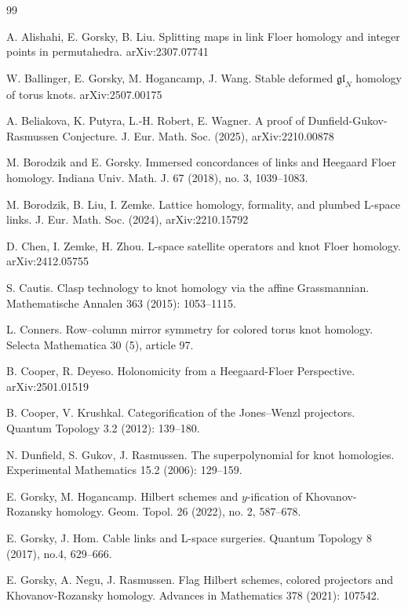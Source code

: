 \begin{thebibliography}{99}

 A. Alishahi, E. Gorsky, B. Liu. Splitting maps in link Floer homology and integer points in permutahedra. arXiv:2307.07741

 W. Ballinger, E. Gorsky, M. Hogancamp, J. Wang. Stable deformed $\mathfrak{gl}_N$ homology of torus knots. arXiv:2507.00175


  A. Beliakova, K. Putyra, L.-H. Robert, E. Wagner. A proof of Dunfield-Gukov-Rasmussen Conjecture. J. Eur. Math. Soc. (2025), arXiv:2210.00878

 M. Borodzik and E. Gorsky. Immersed concordances of links and Heegaard Floer homology. Indiana Univ. Math. J. 67 (2018), no. 3, 1039--1083. 



 M. Borodzik, B. Liu, I. Zemke. Lattice homology, formality,  and plumbed L-space links.  J. Eur. Math. Soc. (2024), arXiv:2210.15792

 D. Chen, I. Zemke, H. Zhou. L-space satellite operators and knot Floer homology. arXiv:2412.05755

 S. Cautis. Clasp technology to knot homology via the affine Grassmannian. Mathematische Annalen 363 (2015): 1053--1115.

 L. Conners. Row--column mirror symmetry for colored torus knot homology.
Selecta Mathematica 30 (5), article 97.

 B. Cooper, R. Deyeso.  Holonomicity from a Heegaard-Floer Perspective. arXiv:2501.01519

 B. Cooper, V. Krushkal. Categorification of the Jones--Wenzl projectors. Quantum Topology 3.2 (2012): 139--180.

 N. Dunfield, S. Gukov, J. Rasmussen. The superpolynomial for knot homologies. Experimental Mathematics 15.2 (2006): 129--159.

 E. Gorsky, M. Hogancamp. Hilbert schemes and  $y$-ification of Khovanov-Rozansky homology.
Geom. Topol. 26 (2022), no. 2, 587--678.

 E. Gorsky, J. Hom. Cable links and L-space surgeries.  
Quantum Topology 8 (2017), no.4, 629--666.

 E. Gorsky, A. Negu, J. Rasmussen. Flag Hilbert schemes, colored projectors and Khovanov-Rozansky homology. Advances in Mathematics 378 (2021): 107542.


\end{thebibliography}
